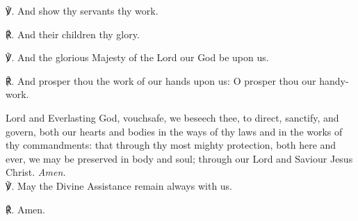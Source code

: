\begin{multicols}{2}
℣. And show thy servants thy work.

℟. And their children thy glory.

℣. And the glorious Majesty of the Lord our God be upon us.

℟. And prosper thou the work of our hands upon us: O prosper thou our handy-work.\\


 Lord and Everlasting God, vouchsafe, we beseech thee, to direct, sanctify, and govern, both our hearts and bodies in the ways of thy laws and in the works of thy commandments: that through thy most mighty protection, both here and ever, we may be preserved in body and soul; through our Lord and Saviour Jesus Christ. \textit{Amen.}\\

℣. May the Divine Assistance remain always with us.

℟. Amen.
\end{multicols}